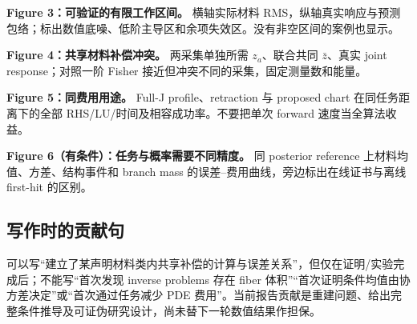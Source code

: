 \textbf{Figure 3：可验证的有限工作区间。}
横轴实际材料 RMS，纵轴真实响应与预测包络；标出数值底噪、低阶主导区和余项失效区。没有非空区间的案例也显示。

\textbf{Figure 4：共享材料补偿冲突。}
两采集单独所需 $z_a$、联合共同 $\bar z$、真实 joint response；对照一阶 Fisher 接近但冲突不同的采集，固定测量数和能量。

\textbf{Figure 5：同费用用途。}
Full-J profile、retraction 与 proposed chart 在同任务距离下的全部 RHS/LU/时间及相容成功率。不要把单次 forward 速度当全算法收益。

\textbf{Figure 6（有条件）：任务与概率需要不同精度。}
同 posterior reference 上材料均值、方差、结构事件和 branch mass 的误差--费用曲线，旁边标出在线证书与离线 first-hit 的区别。

\subsection{写作时的贡献句}
可以写“建立了某声明材料类内共享补偿的计算与误差关系”，但仅在证明/实验完成后；不能写“首次发现 inverse problems 存在 fiber 体积”“首次证明条件均值由协方差决定”或“首次通过任务减少 PDE 费用”。当前报告贡献是重建问题、给出完整条件推导及可证伪研究设计，尚未替下一轮数值结果作担保。

